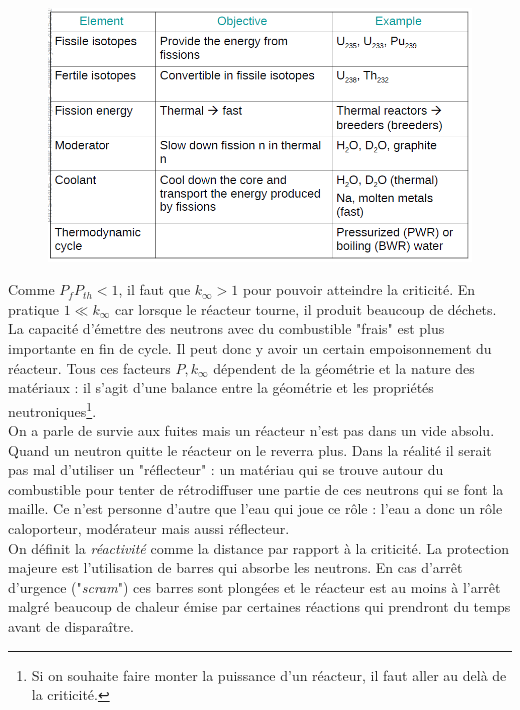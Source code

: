 	\begin{figure}
	\vspace{-5mm}
	\includegraphics[scale=0.25]{ch1/image8.png}
	\end{figure}
Comme $P_fP_{th} < 1$, il faut que $k_\infty > 1$ pour pouvoir atteindre la criticité. En pratique $1 \ll k_\infty$ car lorsque le 
réacteur tourne, il produit beaucoup de déchets. La capacité d'émettre des neutrons avec du 
combustible "frais" est plus importante en fin de cycle. Il peut donc y avoir un certain 
empoisonnement du réacteur. Tous ces facteurs $P,k_\infty$ dépendent de la géométrie et la 
nature des matériaux : il s'agit d'une balance entre la géométrie et les propriétés 
neutroniques\footnote{Si on souhaite faire monter la puissance d'un réacteur, il faut 
aller au delà de la criticité.}.\\


On a parle de survie aux fuites  mais un réacteur n'est pas dans un vide absolu. Quand un 
neutron quitte le réacteur on le reverra plus. Dans la réalité il serait pas mal d'utiliser 
un "réflecteur" : un matériau qui se trouve autour du combustible pour tenter de 
rétrodiffuser une partie de ces neutrons qui se font la maille. Ce n'est personne d'autre 
que l'eau qui joue ce rôle : l'eau a donc un rôle caloporteur, modérateur mais aussi réflecteur. \\

On définit la \textit{réactivité} comme la distance par rapport à la criticité. La protection 
majeure est l'utilisation de barres qui absorbe les neutrons. En cas d'arrêt d'urgence 
("\textit{scram}") ces barres sont plongées et le réacteur est au moins à l'arrêt malgré beaucoup de
chaleur émise par certaines réactions qui prendront du temps avant de disparaître.

